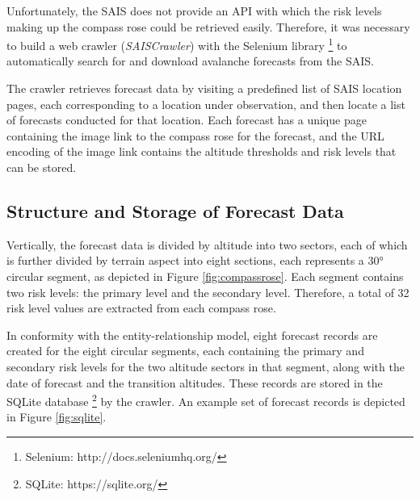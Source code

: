 \documentclass[11pt, oneside]{article}
\begin{document}
		Unfortunately, the SAIS does not provide an API with which the risk levels making up the compass rose could be retrieved easily. Therefore, it was necessary to build a web crawler (\textit{SAISCrawler}) with the Selenium library \footnote{Selenium: http://docs.seleniumhq.org/} to automatically search for and download avalanche forecasts from the SAIS.
		
		The crawler retrieves forecast data by visiting a predefined list of SAIS location pages, each corresponding to a location under observation, and then locate a list of forecasts conducted for that location. Each forecast has a unique page containing the image link to the compass rose for the forecast, and the URL encoding of the image link contains the altitude thresholds and risk levels that can be stored. 
		
	\subsection{Structure and Storage of Forecast Data}
	
		Vertically, the forecast data is divided by altitude into two sectors, each of which is further divided by terrain aspect into eight sections, each represents a 30\si{\degree} circular segment, as depicted in Figure \ref{fig:compassrose}. Each segment contains two risk levels: the primary level and the secondary level. Therefore, a total of 32 risk level values are extracted from each compass rose. 
		
		In conformity with the entity-relationship model, eight forecast records are created for the eight circular segments, each containing the primary and secondary risk levels for the two altitude sectors in that segment, along with the date of forecast and the transition altitudes. These records are stored in the SQLite database \footnote{SQLite: https://sqlite.org/} by the crawler. An example set of forecast records is depicted in Figure \ref{fig:sqlite}.
		
\end{document}

